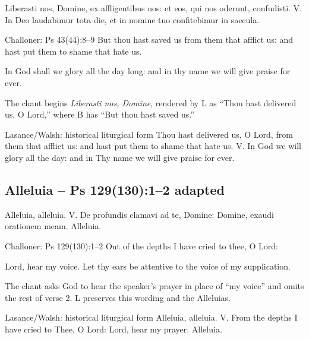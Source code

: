 \begin{latinproper}
Liberasti nos, Domine, ex affligentibus nos: et eos, qui nos oderunt,
confudisti. V. In Deo laudabimur tota die, et in nomine tuo confitebimur
in saecula.
\end{latinproper}

\begin{englishwitness}{Challoner: Ps 43(44):8--9}
But thou hast saved us from them that afflict us: and hast put them to
shame that hate us.

In God shall we glory all the day long: and in thy name we will give
praise for ever.
\end{englishwitness}

The chant begins \textit{Liberasti nos, Domine}, rendered by L as
``Thou hast delivered us, O Lord,'' where B has ``But thou hast saved us.''

\begin{englishwitness}{Lasance/Walsh: historical liturgical form}
Thou hast delivered us, O Lord, from them that afflict us: and hast put
them to shame that hate us. V. In God we will glory all the day: and in
Thy name we will give praise for ever.
\end{englishwitness}

\subsection{Alleluia -- Ps 129(130):1--2 adapted}
\label{proper-alleluia}

\begin{latinproper}
Alleluia, alleluia. V. De profundis clamavi ad te, Domine:
Domine, exaudi orationem meam. Alleluia.
\end{latinproper}

\begin{englishwitness}{Challoner: Ps 129(130):1--2}
Out of the depths I have cried to thee, O Lord:

Lord, hear my voice. Let thy ears be attentive to the voice of my supplication.
\end{englishwitness}

The chant asks God to hear the speaker's prayer in place of ``my voice''
and omits the rest of verse 2. L preserves this wording and the Alleluias.

\begin{englishwitness}{Lasance/Walsh: historical liturgical form}
Alleluia, alleluia. V. From the depths I have cried to Thee, O Lord:
Lord, hear my prayer. Alleluia.
\end{englishwitness}

